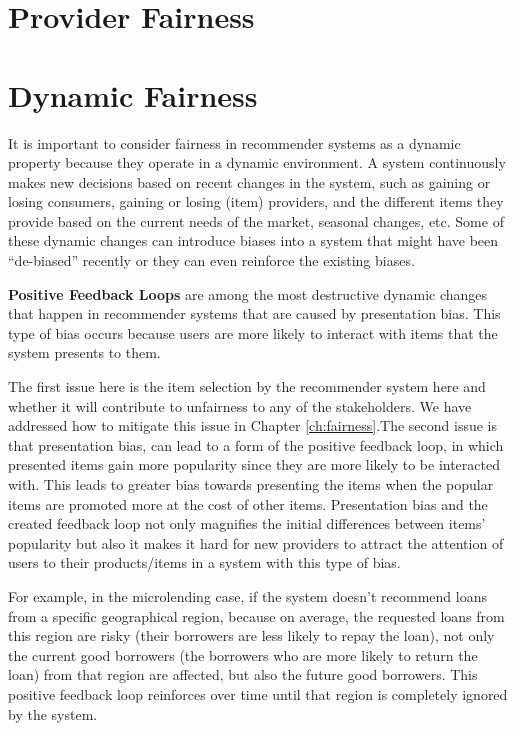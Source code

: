 \section{Provider Fairness}

\section{Dynamic Fairness}

    It is important to consider fairness in recommender systems as a dynamic property because they operate in a dynamic environment. A system continuously makes new decisions based on recent changes in the system, such as gaining or losing consumers, gaining or losing (item) providers, and the different items they provide based on the current needs of the market, seasonal changes, etc. Some of these dynamic changes can introduce biases into a system that might have been ``de-biased'' recently or they can even reinforce the existing biases. 
    
    \textbf{Positive Feedback Loops} are among the most destructive dynamic changes that happen in recommender systems \cite{o2016weapons} that are caused by presentation bias. This type of bias occurs because users are more likely to interact with items that the system presents to them. 
    
    The first issue here is the item selection by the recommender system here and whether it will contribute to unfairness to any of the stakeholders. We have addressed how to mitigate this issue in Chapter \ref{ch:fairness}.The second issue is that presentation bias, can lead to a form of the positive feedback loop, in which presented items gain more popularity since they are more likely to be interacted with. This leads to greater bias towards presenting the items when the popular items are promoted more at the cost of other items. Presentation bias and the created feedback loop not only magnifies the initial differences between items' popularity but also it makes it hard for new providers to attract the attention of users to their products/items in a system with this type of bias.
    
    For example, in the microlending case, if the system doesn't recommend loans from a specific geographical region, because on average, the requested loans from this region are risky (their borrowers are less likely to repay the loan), not only the current good borrowers (the borrowers who are more likely to return the loan) from that region are affected, but also the future good borrowers. This positive feedback loop reinforces over time until that region is completely ignored by the system.
    
